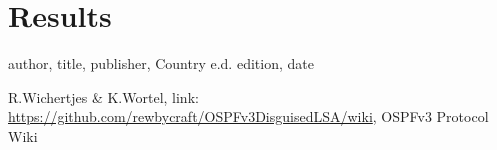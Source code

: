 \documentclass[11pt,a4paper,oneside]{article}
\begin{document}
    \section{Results}\label{Results}
    		
    
    
    \begin{thebibliography}{999}
author,
title,
publisher,
Country e.d.
edition,
date

R.Wichertjes \& K.Wortel,
link: \url{https://github.com/rewbycraft/OSPFv3DisguisedLSA/wiki},
OSPFv3 Protocol Wiki



    \end{thebibliography}
\end{document}
